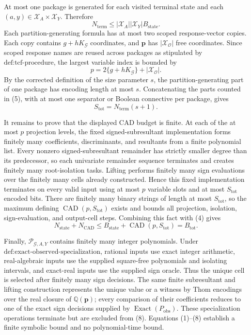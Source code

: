 At most one package is generated for each visited terminal state and each \((a,y)\in\mathcal X_A\times\mathcal X_Y\). Therefore
\[
N_{\mathrm{term}}
\leq |\mathcal X_A||\mathcal X_Y|B_{\mathrm{state}}.
\tag{5}
\]
Each partition-generating formula has at most two scoped response-vector copies. Each copy contains \(g+hK_{\mathcal G}\) coordinates, and \(\mathbf p\) has \(|\mathcal X_{\mathcal O}|\) free coordinates. Since scoped response names are reused across packages as stipulated by \(\text{def:tcf-procedure}\), the largest variable index is bounded by
\[
p=2\{g+hK_{\mathcal G}\}+|\mathcal X_{\mathcal O}|.
\tag{6}
\]
By the corrected definition of the size parameter \(s\), the partition-generating part of one package has encoding length at most \(s\). Concatenating the parts counted in (5), with at most one separator or Boolean connective per package, gives
\[
S_{\mathrm{tot}}=N_{\mathrm{term}}(s+1).
\tag{7}
\]

It remains to prove that the displayed CAD budget is finite. At each of the at most \(p\) projection levels, the fixed signed-subresultant implementation forms finitely many coefficients, discriminants, and resultants from a finite polynomial list. Every nonzero signed-subresultant remainder has strictly smaller degree than its predecessor, so each univariate remainder sequence terminates and creates finitely many root-isolation tasks. Lifting performs finitely many sign evaluations over the finitely many cells already constructed. Hence this fixed implementation terminates on every valid input using at most \(p\) variable slots and at most \(S_{\mathrm{tot}}\) encoded bits. There are finitely many binary strings of length at most \(S_{\mathrm{tot}}\), so the maximum defining \(\operatorname{CAD}(p,S_{\mathrm{tot}})\) exists and bounds all projection, isolation, sign-evaluation, and output-cell steps. Combining this fact with (4) gives
\[
N_{\mathrm{state}}+N_{\mathrm{CAD}}
\leq B_{\mathrm{state}}+\operatorname{CAD}(p,S_{\mathrm{tot}})
=B_{\mathrm{tot}}.
\tag{8}
\]

Finally, \(\mathscr P_{\mathcal G,A,Y}\) contains finitely many integer polynomials. Under \(\text{def:exact-observed-specialization}\), rational inputs use exact integer arithmetic, real-algebraic inputs use the supplied square-free polynomials and isolating intervals, and exact-real inputs use the supplied sign oracle. Thus the unique cell is selected after finitely many sign decisions. The same finite subresultant and lifting construction represents the unique value or a witness by Thom encodings over the real closure of \(\mathbb Q(\mathbf p)\); every comparison of their coefficients reduces to one of the exact sign decisions supplied by \(\operatorname{Exact}(P_{\mathrm{obs}})\). These specialization operations terminate but are excluded from (8). Equations (1)--(8) establish a finite symbolic bound and no polynomial-time bound.